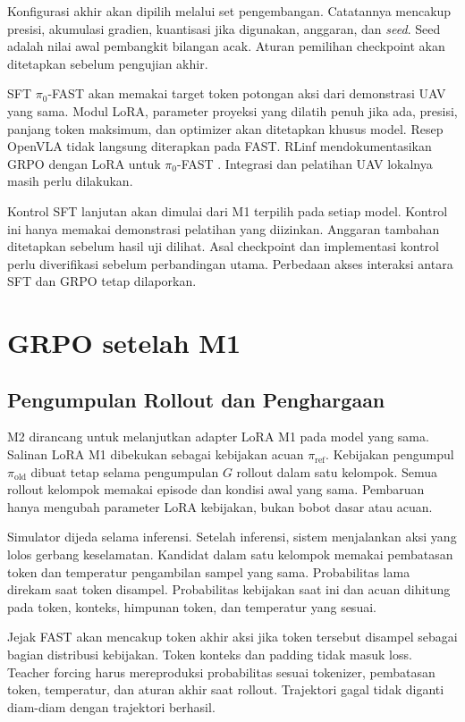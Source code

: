 Konfigurasi akhir akan dipilih melalui set pengembangan. Catatannya mencakup presisi, akumulasi gradien, kuantisasi jika digunakan, anggaran, dan \textit{seed}. Seed adalah nilai awal pembangkit bilangan acak. Aturan pemilihan checkpoint akan ditetapkan sebelum pengujian akhir.

SFT $\pi_0$-FAST akan memakai target token potongan aksi dari demonstrasi UAV yang sama. Modul LoRA, parameter proyeksi yang dilatih penuh jika ada, presisi, panjang token maksimum, dan optimizer akan ditetapkan khusus model. Resep OpenVLA tidak langsung diterapkan pada FAST. RLinf mendokumentasikan GRPO dengan LoRA untuk $\pi_0$-FAST \citep{rlinf2026pi0fast}. Integrasi dan pelatihan UAV lokalnya masih perlu dilakukan.

Kontrol SFT lanjutan akan dimulai dari M1 terpilih pada setiap model. Kontrol ini hanya memakai demonstrasi pelatihan yang diizinkan. Anggaran tambahan ditetapkan sebelum hasil uji dilihat. Asal checkpoint dan implementasi kontrol perlu diverifikasi sebelum perbandingan utama. Perbedaan akses interaksi antara SFT dan GRPO tetap dilaporkan.

\section{GRPO setelah M1}
\label{sec:lora_grpo_experiment}
\subsection{Pengumpulan Rollout dan Penghargaan}
M2 dirancang untuk melanjutkan adapter LoRA M1 pada model yang sama. Salinan LoRA M1 dibekukan sebagai kebijakan acuan $\pi_{\mathrm{ref}}$. Kebijakan pengumpul $\pi_{\mathrm{old}}$ dibuat tetap selama pengumpulan $G$ rollout dalam satu kelompok. Semua rollout kelompok memakai episode dan kondisi awal yang sama. Pembaruan hanya mengubah parameter LoRA kebijakan, bukan bobot dasar atau acuan.

Simulator dijeda selama inferensi. Setelah inferensi, sistem menjalankan aksi yang lolos gerbang keselamatan. Kandidat dalam satu kelompok memakai pembatasan token dan temperatur pengambilan sampel yang sama. Probabilitas lama direkam saat token disampel. Probabilitas kebijakan saat ini dan acuan dihitung pada token, konteks, himpunan token, dan temperatur yang sesuai.

Jejak FAST akan mencakup token akhir aksi jika token tersebut disampel sebagai bagian distribusi kebijakan. Token konteks dan padding tidak masuk loss. Teacher forcing harus mereproduksi probabilitas sesuai tokenizer, pembatasan token, temperatur, dan aturan akhir saat rollout. Trajektori gagal tidak diganti diam-diam dengan trajektori berhasil.

